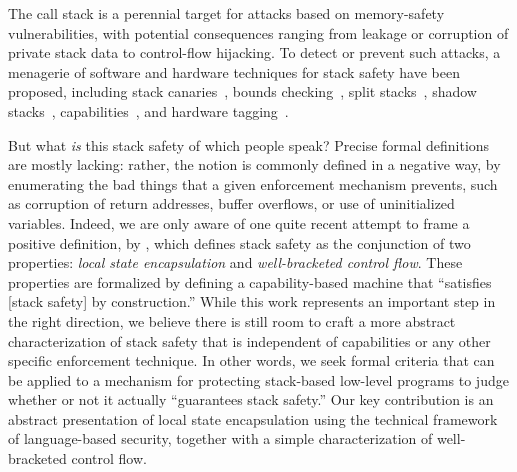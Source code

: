 \documentclass[acmsmall,review,anonymous]{acmart}\settopmatter{printfolios=true,printccs=false,printacmref=false}
\begin{document}

The call stack is a perennial target for attacks
based on memory-safety vulnerabilities, with potential consequences
ranging from leakage or corruption of private stack data to
control-flow hijacking. To detect or prevent such attacks, a menagerie of
software and hardware techniques for stack safety have been proposed,
%
including stack canaries~\citep{Cowan+98},
bounds checking~\citep{NagarakatteZMZ09,NagarakatteZMZ10,DeviettiBMZ08},
split stacks~\citep{Kuznetsov+14},
shadow stacks~\citep{Dang+15,Shanbhogue+19},
capabilities~\citep{Woodruff+14,Chisnall+15,Skorstengaard+19,Skorstengaard+19b},
and hardware tagging~\citep{DBLP:conf/sp/RoesslerD18}. \ifaftersubmission{}
\fi

But what {\em is} this stack safety of which people speak? Precise formal
definitions are mostly lacking: rather, the notion
is commonly defined in a negative way, by enumerating the bad things that a
given enforcement mechanism
prevents, such as corruption of return addresses, buffer overflows, or
use of uninitialized variables.
Indeed, we are only aware of one quite recent attempt to frame a
positive definition, by
\citet{Skorstengaard+19}, which defines stack safety as
the conjunction of two properties: {\em local state encapsulation} and {\em
  well-bracketed control flow}.
These properties are formalized by defining a capability-based machine
that ``satisfies [stack safety] by construction.''
%
While this work represents an important step in the right direction, we believe
there is still room to craft a more abstract characterization
of stack safety that is independent of capabilities or any other specific
enforcement
technique.  In other words, we seek formal criteria that can be applied
to a mechanism for protecting stack-based low-level programs to judge
whether or not it actually ``guarantees stack safety.''
%
Our key contribution is an abstract
presentation of local state encapsulation using the technical
framework of language-based security, together with a simple
characterization of well-bracketed control flow.
\end{document}
